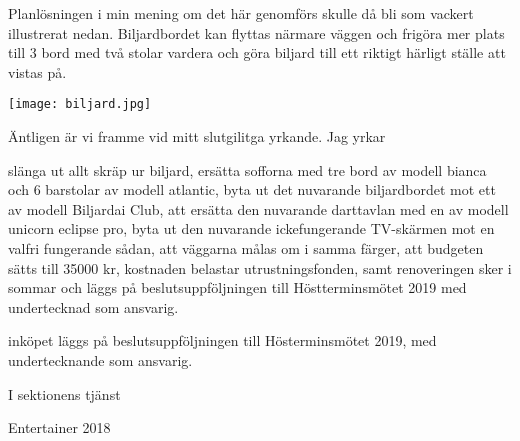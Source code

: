 \documentclass[../_main/handlingar.tex]{subfiles}
\begin{document}
Planlösningen i min mening om det här genomförs skulle då bli som vackert illustrerat
nedan. Biljardbordet kan flyttas närmare väggen och frigöra mer plats till 3 bord med två
stolar vardera och göra biljard till ett riktigt härligt ställe att vistas på.


\begin{center}
    \texttt{[image: biljard.jpg]}
\end{center}

\newpage

Äntligen är vi framme vid mitt slutgilitga yrkande. Jag yrkar

    \begin{attsatser}
       \att slänga ut allt skräp ur biljard,
       \att ersätta sofforna med tre bord av modell bianca och 6 barstolar av modell atlantic,
       \att byta ut det nuvarande biljardbordet mot ett av modell Biljardai Club,
       \att att ersätta den nuvarande darttavlan med en av modell unicorn eclipse pro,
        \att byta ut den nuvarande ickefungerande TV-skärmen mot en valfri fungerande sådan,
        \att att väggarna målas om i samma färger,
        \att att budgeten sätts till 35000 kr,
        \att kostnaden belastar utrustningsfonden, samt 
        \att renoveringen sker i sommar och läggs på beslutsuppföljningen till Höstterminsmötet 2019 med undertecknad som ansvarig.

       \att inköpet läggs på beslutsuppföljningen till Hösterminsmötet 2019, med undertecknande som ansvarig.
    \end{attsatser}
    


\begin{signatures}{1}
        I sektionens tjänst
        \signature{Adam Belfrage}{Entertainer 2018}
    \end{signatures}
\end{document}
